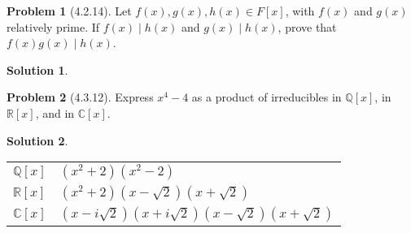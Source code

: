 \documentclass[12pt]{article}
\theoremstyle{definition}
\newtheorem*{prob}{Problem}
\newtheorem*{soln}{Solution}
\newcommand{\CC}{{\mathbb{C}}}
\newcommand{\ZZ}{{\mathbb{Z}}}
\newcommand{\RR}{{\mathbb{R}}}
\newcommand{\QQ}{{\mathbb{Q}}}
\begin{document}
%
%
%

\begin{prob}[4.2.14]
Let $f(x), g(x), h(x)\in F[x]$, with $f(x)$ and $g(x)$ relatively prime. 
If  $f(x) \mid h(x)$ and $g(x) \mid h(x)$, prove that $f(x)g(x) \mid h(x)$.
\end{prob}

\begin{soln}

\end{soln}


\begin{prob}[4.3.12]
Express $x^4 - 4$ as a product of irreducibles in $\QQ[x]$, in $\RR[x]$, and in $\CC[x]$.
\end{prob}

\begin{soln}
\quad

\begin{tabular}{l l}
$\QQ[x]$ & $(x^2+2)(x^2-2)$\\
$\RR[x]$ & $(x^2+2)(x-\sqrt2)(x+\sqrt2)$\\
$\CC[x]$ & $(x-i\sqrt2)(x+i\sqrt2)(x-\sqrt2)(x+\sqrt2)$\\
\end{tabular}

\end{soln}


%
%
%

%
%
\end{document}
